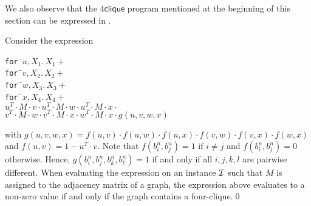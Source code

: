 We also observe that the $4\textsf{clique}$ program mentioned at the beginning of this section can 
be expressed in \langfor.
\begin{example}
Consider the expression
\begin{tabbing}
\texttt{for }\=$u,X_1.\, X_1 + $\\
\> \texttt{for }\=$v,X_2.\, X_2 +$ \\
\>\>\texttt{for }\=$w,X_3.\, X_3 +$ \\
\>\>\>\texttt{for }\=$x,X_4.\, X_4 +$ \\
\>\>\>\>$u^T\cdot M\cdot v \cdot u^T\cdot M\cdot w\cdot u^T\cdot M\cdot x \cdot $\\
\>\>\>\>$v^T\cdot M\cdot w \cdot v^T\cdot M\cdot x\cdot w^T\cdot M\cdot x \cdot g(u,v,w,x)$\\
\end{tabbing}
with $g(u,v,w,x)=f(u,v)\cdot f(u,w)\cdot f(u,x)\cdot f(v,w)\cdot f(v,x)\cdot f(w,x)$ and
$f(u,v)=1-u^T\cdot v$. Note that $f(b_i^n,b_j^n)=1$ if $i\neq j$ and $f(b_i^n,b_j^n)=0$ otherwise.
Hence, $g(b_i^n,b_j^n,b_k^n,b_\ell^n)=1$ if and only if all $i,j,k,l$ are pairwise different.
When evaluating the expression on an instance $\mathcal{I}$ such that $M$ is assigned to the adjacency 
matrix of a graph, the expression above evaluates to a non-zero value if and only if the graph
contains a four-clique.\qed
\end{example}
%
%

